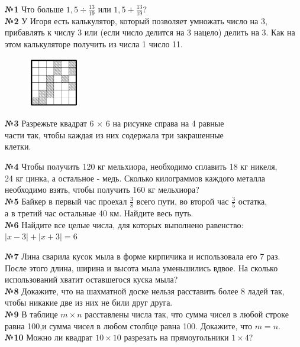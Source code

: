 \documentclass[12 pt, a4paper]{article}%
\newcommand{\task}[1]{{{\vspace{0.6cm} \vspace{-2ex} \textbf{№{#1}}  }}}
\begin{document}
\large
	\raggedright
	
	\task{1} Что больше $1,5 \div \frac{13}{19}$ или $1,5 + \frac{13}{19}$?\\
	
	\task{2} У Игоря есть калькулятор, который позволяет умножать число на 3, прибавлять к числу 3 или (если число делится на 3 нацело) делить на 3. Как на этом калькуляторе получить из числа 1 число 11.\\
	
	\begin{figure}
		\vspace{-6ex}
		\centering
		\includegraphics[width=0.2\textwidth]{pila_9.jpg}
	\end{figure}
	\textbf{№3} Разрежьте квадрат 6 × 6 на рисунке справа на 4 равные\\ части так, чтобы каждая из них содержала три закрашенные\\ клетки.
	
	\task{4} Чтобы получить 120 кг мельхиора, необходимо сплавить 18 кг никеля,\\ 24 кг цинка, а остальное - медь. Сколько килограммов каждого металла необходимо взять, чтобы получить 160 кг мельхиора?\\
	
	\task{5} Байкер в первый час проехал $\frac{3}{8}$ всего пути, во второй час $\frac{3}{5}$  остатка,\\а в третий час остальные 40 км. Найдите весь путь.\\
	
	\task{6} Найдите все целые числа, для которых выполнено равенство:\\
	\centering $|x-3|+|x+3|=6$\\ \raggedright
	
	\task{7} Лина сварила кусок мыла в форме кирпичика и использовала его 7 раз. После этого длина, ширина и высота мыла уменьшились вдвое. На сколько использований хватит оставшегося куска мыла?\\
	
	\task{8} Докажите, что на шахматной доске нельзя расставить более 8 ладей так, чтобы никакие две из них не били друг друга.\\

	\task{9} В таблице $m \times n$ расставлены числа так, что сумма чисел в любой строке равна 100,и сумма чисел в любом столбце равна 100. Докажите, что $m=n$.\\
	
	\task{10} Можно ли квадрат $10 \times 10$ разрезать на прямоугольники $1 \times 4$?\\
	
\end{document}
